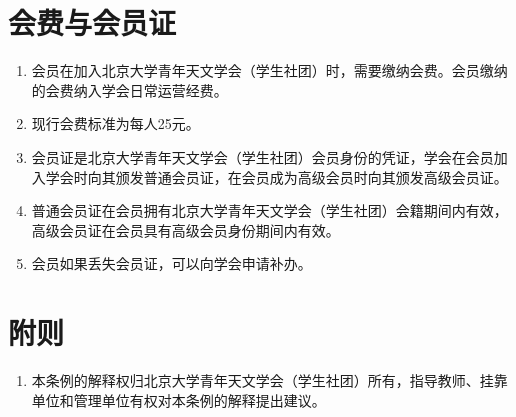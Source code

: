 \section{会费与会员证}

\begin{enumerate}[resume]
    \item 会员在加入北京大学青年天文学会（学生社团）时，需要缴纳会费。会员缴纳的会费纳入学会日常运营经费。
    
    \item 现行会费标准为每人25元。\label{item:membership_fee}

    \item 会员证是北京大学青年天文学会（学生社团）会员身份的凭证，学会在会员加入学会时向其颁发普通会员证，在会员成为高级会员时向其颁发高级会员证。
    
    \item 普通会员证在会员拥有北京大学青年天文学会（学生社团）会籍期间内有效，高级会员证在会员具有高级会员身份期间内有效。
    
    \item 会员如果丢失会员证，可以向学会申请补办。
\end{enumerate}

\section{附则}

\begin{enumerate}[resume]        
    \item 本条例的解释权归北京大学青年天文学会（学生社团）所有，指导教师、挂靠单位和管理单位有权对本条例的解释提出建议。
\end{enumerate}
